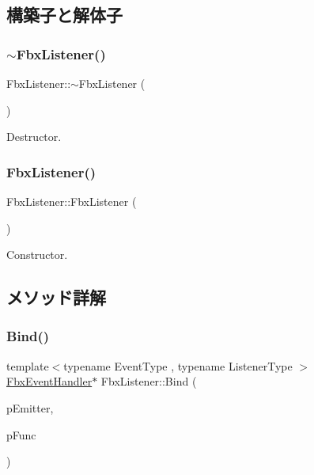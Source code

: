 \subsection{構築子と解体子}
\mbox{\label{class_fbx_listener_a47f9225b672464b671e7d260fba28fa3}} 
\subsubsection{\texorpdfstring{$\sim$\+Fbx\+Listener()}{~FbxListener()}}
{\footnotesize\ttfamily Fbx\+Listener\+::$\sim$\+Fbx\+Listener (\begin{DoxyParamCaption}{ }\end{DoxyParamCaption})}



Destructor. 

\mbox{\label{class_fbx_listener_a8d0059633c0a29709abd105fb4f911ec}} 
\subsubsection{\texorpdfstring{Fbx\+Listener()}{FbxListener()}}
{\footnotesize\ttfamily Fbx\+Listener\+::\+Fbx\+Listener (\begin{DoxyParamCaption}{ }\end{DoxyParamCaption})}



Constructor. 



\subsection{メソッド詳解}
\mbox{\label{class_fbx_listener_a7a3298b1f4fa347aaa2cb5136265a178}} 
\subsubsection{\texorpdfstring{Bind()}{Bind()}\hspace{0.1cm}{\footnotesize\ttfamily [1/3]}}
{\footnotesize\ttfamily template$<$typename Event\+Type , typename Listener\+Type $>$ \\
\hyperlink{class_fbx_event_handler}{Fbx\+Event\+Handler}$\ast$ Fbx\+Listener\+::\+Bind (\begin{DoxyParamCaption}\item[{\hyperlink{class_fbx_emitter}{Fbx\+Emitter} \&}]{p\+Emitter,  }\item[{void(Listener\+Type\+::$\ast$)(const Event\+Type $\ast$)}]{p\+Func }\end{DoxyParamCaption})}

